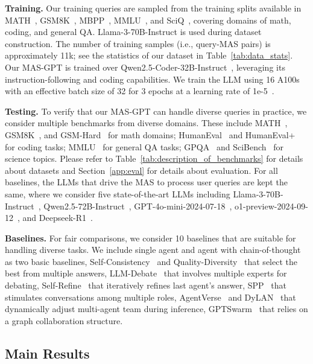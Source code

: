 \documentclass{article}
\theoremstyle{plain}
\theoremstyle{definition}
\theoremstyle{remark}
\begin{document}
\textbf{Training.}
Our training queries are sampled from the training splits available in MATH~\cite{hendrycksmath2021}, GSM8K~\cite{cobbe2021gsm8k}, MBPP~\cite{mbpp}, MMLU~\cite{mmlu}, and SciQ~\cite{sciq}, covering domains of math, coding, and general QA.
Llama-3-70B-Instruct is used during dataset construction.
The number of training samples (i.e., query-MAS pairs) is approximately 11k; see the statistics of our dataset in Table~\ref{tab:data_stats}.
Our MAS-GPT is trained over Qwen2.5-Coder-32B-Instruct~\cite{yang2024qwen2}, leveraging its instruction-following and coding capabilities.
We train the LLM using 16 A100s with an effective batch size of 32 for 3 epochs at a learning rate of 1e-5~\cite{zheng-etal-2024-llamafactory}.

\textbf{Testing.}
To verify that our MAS-GPT can handle diverse queries in practice, we consider multiple benchmarks from diverse domains.
These include MATH~\cite{hendrycksmath2021}, GSM8K~\cite{cobbe2021gsm8k}, and GSM-Hard~\cite{gsm-hard} for math domains; HumanEval~\cite{humaneval} and HumanEval+~\cite{evalplus} for coding tasks; MMLU~\cite{mmlu} for general QA tasks; GPQA~\cite{rein2023gpqa} and SciBench~\cite{wangscibench} for science topics.
Please refer to Table~\ref{tab:description_of_benchmarks} for details about datasets and Section~\ref{app:eval} for details about evaluation.
For all baselines, the LLMs that drive the MAS to process user queries are kept the same, where we consider five state-of-the-art LLMs including Llama-3-70B-Instruct~\cite{dubey2024llama}, Qwen2.5-72B-Instruct~\cite{yang2024qwen2}, GPT-4o-mini-2024-07-18~\cite{gpt-4o-mini}, o1-preview-2024-09-12~\cite{o1-preview}, and Deepseek-R1~\cite{guo2025deepseek}.

\textbf{Baselines.}
For fair comparisons, we consider 10 baselines that are suitable for handling diverse tasks.
We include single agent and agent with chain-of-thought~\cite{wei2022chain} as two basic baselines,
Self-Consistency~\cite{wangself} and Quality-Diversity~\cite{luintelligent} that select the best from multiple answers,
LLM-Debate~\cite{duimproving} that involves multiple experts for debating,
Self-Refine~\cite{madaan2024self} that iteratively refines last agent's answer, SPP~\cite{wang2024unleashing} that stimulates conversations among multiple roles,
AgentVerse~\cite{chen2023agentverse} and DyLAN~\cite{liu2024dynamic} that dynamically adjust multi-agent team during inference,
GPTSwarm~\cite{zhugegptswarm} that relies on a graph collaboration structure.

\subsection{Main Results}
\end{document}
